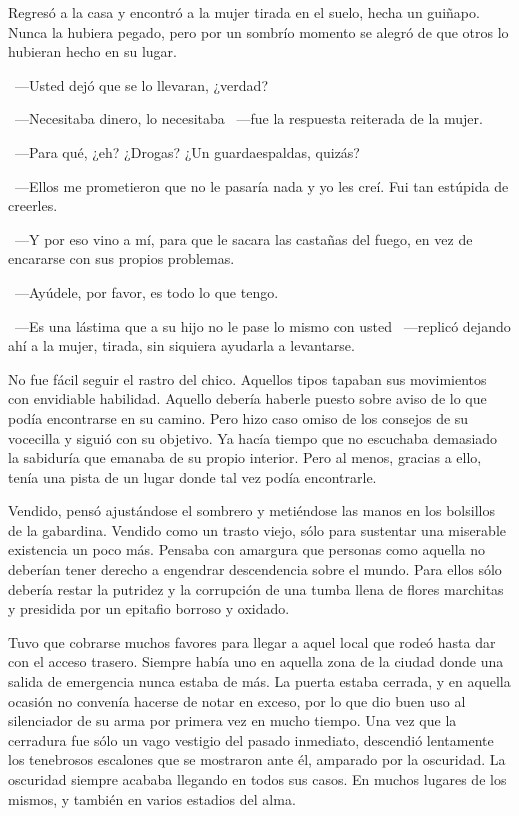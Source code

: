 Regresó a la casa y encontró a la mujer tirada en el suelo, hecha un guiñapo. Nunca la hubiera pegado, pero por un sombrío momento se alegró de que otros lo hubieran hecho en su lugar.

~---Usted dejó que se lo llevaran, ¿verdad?

~---Necesitaba dinero, lo necesitaba ~---fue la respuesta reiterada de la mujer.

~---Para qué, ¿eh? ¿Drogas? ¿Un guardaespaldas, quizás?

~---Ellos me prometieron que no le pasaría nada y yo les creí. Fui tan estúpida de creerles.

~---Y por eso vino a mí, para que le sacara las castañas del fuego, en vez de encararse con sus propios problemas.

~---Ayúdele, por favor, es todo lo que tengo.

~---Es una lástima que a su hijo no le pase lo mismo con usted ~---replicó dejando ahí a la mujer, tirada, sin siquiera ayudarla a levantarse.

\parbreak
No fue fácil seguir el rastro del chico. Aquellos tipos tapaban sus movimientos con envidiable habilidad. Aquello debería haberle puesto sobre aviso de lo que podía encontrarse en su camino. Pero hizo caso omiso de los consejos de su vocecilla y siguió con su objetivo. Ya hacía tiempo que no escuchaba demasiado la sabiduría que emanaba de su propio interior. Pero al menos, gracias a ello, tenía una pista de un lugar donde tal vez podía encontrarle.

Vendido, pensó ajustándose el sombrero y metiéndose las manos en los bolsillos de la gabardina. Vendido como un trasto viejo, sólo para sustentar una miserable existencia un poco más. Pensaba con amargura que personas como aquella no deberían tener derecho a engendrar descendencia sobre el mundo. Para ellos sólo debería restar la putridez y la corrupción de una tumba llena de flores marchitas y presidida por un epitafio borroso y oxidado.

Tuvo que cobrarse muchos favores para llegar a aquel local que rodeó hasta dar con el acceso trasero. Siempre había uno en aquella zona de la ciudad donde una salida de emergencia nunca estaba de más. La puerta estaba cerrada, y en aquella ocasión no convenía hacerse de notar en exceso, por lo que dio buen uso al silenciador de su arma por primera vez en mucho tiempo. Una vez que la cerradura fue sólo un vago vestigio del pasado inmediato, descendió lentamente los tenebrosos escalones que se mostraron ante él, amparado por la oscuridad. La oscuridad siempre acababa llegando en todos sus casos. En muchos lugares de los mismos, y también en varios estadios del alma.

